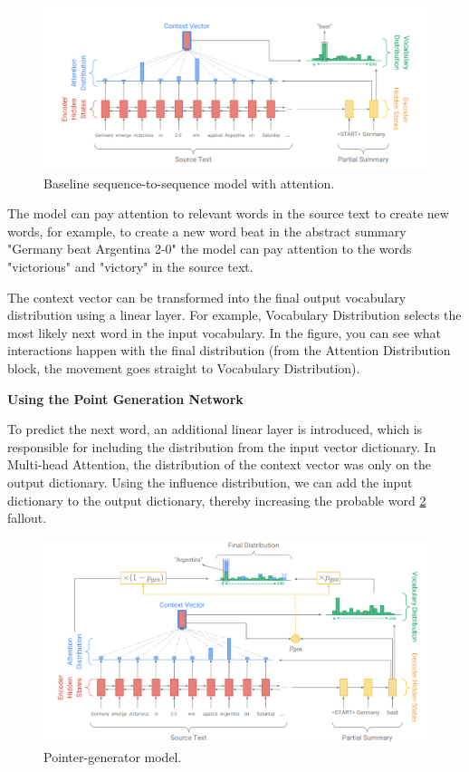\documentclass{article}
\begin{document}
\begin{figure}[!tbh]
    \centering
    \includegraphics[width=0.9\linewidth]{baseline_seq2seq_model.png}
    \caption{Baseline sequence-to-sequence model with attention.}
    \label{fig:baseline_seq2seq_model}
\end{figure}

The model can pay attention to relevant words in the source text to create new words, for example, to create a new word beat in the abstract summary "Germany beat Argentina 2-0" the model can pay attention to the words "victorious" and "victory" in the source text.

The context vector can be transformed into the final output vocabulary distribution using a linear layer. For example, Vocabulary Distribution selects the most likely next word in the input vocabulary. In the figure, you can see what interactions happen with the final distribution (from the Attention Distribution block, the movement goes straight to Vocabulary Distribution).

\textbf{Using the Point Generation Network}

To predict the next word, an additional linear layer is introduced, which is responsible for including the distribution from the input vector dictionary. In Multi-head Attention, the distribution of the context vector was only on the output dictionary. Using the influence distribution, we can add the input dictionary to the output dictionary, thereby increasing the probable word \ref{fig:baseline_pgn} fallout.

\begin{figure}[!tbh]
    \centering
    \includegraphics[width=0.9\linewidth]{baseline_pgn.png}
    \caption{Pointer-generator model.}
    \label{fig:baseline_pgn}
\end{figure}
\end{document}
